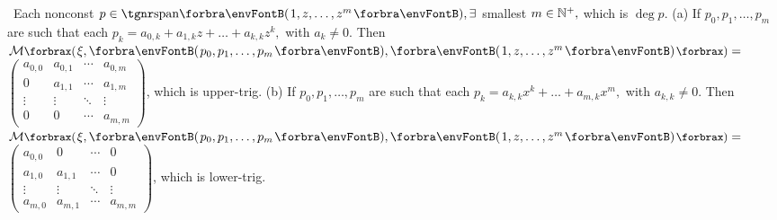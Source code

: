 \BulletPointX{} \,\,\,Each nonconst $p\in\Span{1,z,\dots,z^m},\exists$ smallest $m\in{\mathbb{N}^+},$ which is $\deg p.$\TextB{}
(a) If $p_0,p_1,\dots,p_m$ are such that each\TextB{}
\Ha $p_k=a_{0,k}+a_{1,k}z+\dots+a_{k,k}z^k,$ with $a_k\neq 0.$\TextB{\vspace{-15pt}}
\Ha Then $\Mt[\XPar]{\xi,\Par{p_0,p_1,\dots,p_m},\Par{1,z,\dots,z^m}}={}${\small$\begin{pmatrix}
		a_{0,0} & a_{0,1} & \cdots & a_{0,m}\\
		0       & a_{1,1} & \cdots & a_{1,m}\\
		\vdots  & \vdots  & \ddots & \vdots\\
		0       & 0       & \cdots & a_{m,m}
	\end{pmatrix}$}, which is upper-trig.\TextB{\vspace{-8pt}}
(b) If $p_0,p_1,\dots,p_m$ are such that each\TextB{}
\Hb $p_k=a_{k,k}x^k+\dots+a_{m,k}x^m,$ with $a_{k,k}\neq 0.$\TextB{\vspace{-15pt}}
\Hb Then $\Mt[\XPar]{\xi,\Par{p_0,p_1,\dots,p_m},\Par{1,z,\dots,z^m}}={}${\small$\begin{pmatrix}
		a_{0,0} & 0       & \cdots & 0\\
		a_{1,0} & a_{1,1} & \cdots & 0\\
		\vdots  & \vdots  & \ddots & \vdots\\
		a_{m,0} & a_{m,1} & \cdots & a_{m,m}
	\end{pmatrix}$}, which is lower-trig.\vspace{8pt}
\SepLine

